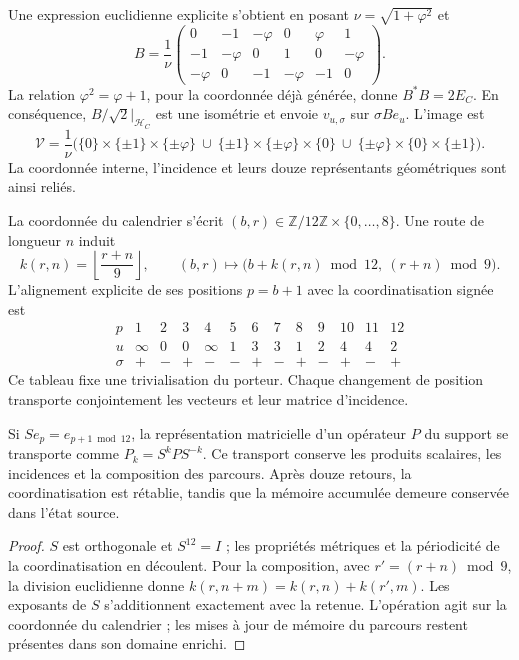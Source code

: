 Une expression euclidienne explicite s'obtient en posant
\(\nu=\sqrt{1+\varphi^2}\) et
\[
 B=\frac1\nu
 \begin{pmatrix}
 0&-1&-\varphi&0&\varphi&1\\
 -1&-\varphi&0&1&0&-\varphi\\
 -\varphi&0&-1&-\varphi&-1&0
 \end{pmatrix}.
\]
La relation \(\varphi^2=\varphi+1\), pour la coordonnée déjà générée, donne \(B^*B=2E_C\). En conséquence, \(B/\sqrt2|_{\mathcal H_C}\) est une isométrie et envoie \(v_{u,\sigma}\) sur \(\sigma Be_u\). L'image est
\[
 \mathcal V=\frac1\nu\bigl(
 \{0\}\times\{\pm1\}\times\{\pm\varphi\}\ \cup\
 \{\pm1\}\times\{\pm\varphi\}\times\{0\}\ \cup\
 \{\pm\varphi\}\times\{0\}\times\{\pm1\}\bigr).
\]
La coordonnée interne, l'incidence et leurs
douze représentants géométriques sont ainsi reliés.

La coordonnée du calendrier s'écrit \((b,r)\in
\mathbb Z/12\mathbb Z\times\{0,\ldots,8\}\). Une route de longueur \(n\)
induit
\[
 k(r,n)=\left\lfloor\frac{r+n}{9}\right\rfloor,\qquad
 (b,r)\longmapsto
 \bigl(b+k(r,n)\bmod12,\ (r+n)\bmod9\bigr).
\]
L'alignement explicite de ses positions \(p=b+1\) avec la coordinatisation signée est
\[
\begin{array}{c|rrrrrrrrrrrr}
p&1&2&3&4&5&6&7&8&9&10&11&12\\ \hline
u&\infty&0&0&\infty&1&3&3&1&2&4&4&2\\
\sigma&+&-&+&-&-&+&-&+&-&+&-&+
\end{array}
\]
Ce tableau fixe une trivialisation du porteur. Chaque changement de position
transporte conjointement les vecteurs et leur matrice d'incidence.

\begin{proposition}
Si \(S e_p=e_{p+1\bmod12}\), la représentation matricielle d'un opérateur \(P\) du support se transporte comme \(P_k=S^kPS^{-k}\). Ce transport conserve les produits scalaires, les incidences et la composition des parcours. Après douze retours, la coordinatisation est rétablie, tandis que la mémoire accumulée demeure conservée dans l'état source.
\end{proposition}
\begin{proof}
\(S\) est orthogonale et \(S^{12}=I\) ; les propriétés métriques et la périodicité de la coordinatisation en découlent. Pour la composition, avec \(r'=(r+n)\bmod9\), la division euclidienne donne \(k(r,n+m)=k(r,n)+k(r',m)\). Les exposants de \(S\) s'additionnent exactement avec la retenue. L'opération agit sur la coordonnée du calendrier ; les mises à jour de mémoire du parcours restent présentes dans son domaine enrichi.
\end{proof}


